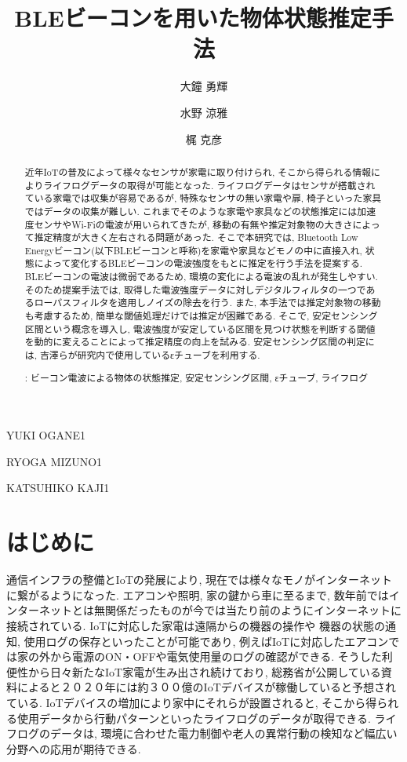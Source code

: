 \documentclass[Japanese]{dicomopapers}
\begin{document}
\title{BLEビーコンを用いた物体状態推定手法}


\author{大鐘 勇輝}{YUKI OGANE}{1}
\author{水野 涼雅}{RYOGA MIZUNO}{1}
\author{梶 克彦}{KATSUHIKO KAJI}{1}




\begin{abstract}
近年IoTの普及によって様々なセンサが家電に取り付けられ, そこから得られる情報によりライフログデータの取得が可能となった.
ライフログデータはセンサが搭載されている家電では収集が容易であるが, 特殊なセンサの無い家電や扉, 椅子といった家具ではデータの収集が難しい.
これまでそのような家電や家具などの状態推定には加速度センサやWi-Fiの電波が用いられてきたが, 移動の有無や推定対象物の大きさによって推定精度が大きく左右される問題があった.
そこで本研究では, Bluetooth Low Energyビーコン(以下BLEビーコンと呼称)を家電や家具などモノの中に直接入れ, 状態によって変化するBLEビーコンの電波強度をもとに推定を行う手法を提案する.
BLEビーコンの電波は微弱であるため, 環境の変化による電波の乱れが発生しやすい.
そのため提案手法では, 取得した電波強度データに対しデジタルフィルタの一つであるローパスフィルタを適用しノイズの除去を行う.
また, 本手法では推定対象物の移動も考慮するため, 簡単な閾値処理だけでは推定が困難である.
そこで, 安定センシング区間という概念を導入し, 電波強度が安定している区間を見つけ状態を判断する閾値を動的に変えることによって推定精度の向上を試みる.
安定センシング区間の判定には, 吉澤ら\cite{ips-chube}が研究内で使用しているεチューブを利用する.

 : ビーコン電波による物体の状態推定, 安定センシング区間, εチューブ, ライフログ


\end{abstract}

\maketitle

\section{はじめに}
通信インフラの整備とIoTの発展により, 現在では様々なモノがインターネットに繋がるようになった.
エアコンや照明, 家の鍵から車に至るまで, 数年前ではインターネットとは無関係だったものが今では当たり前のようにインターネットに接続されている.
IoTに対応した家電は遠隔からの機器の操作や 機器の状態の通知, 使用ログの保存といったことが可能であり, 例えばIoTに対応したエアコンでは家の外から電源のON・OFFや電気使用量のログの確認ができる.
そうした利便性から日々新たなIoT家電が生み出され続けており, 総務省が公開している資料\cite{soumusyo}によると２０２０年には約３００億のIoTデバイスが稼働していると予想されている.
IoTデバイスの増加により家中にそれらが設置されると, そこから得られる使用データから行動パターンといったライフログのデータが取得できる.
ライフログのデータは, 環境に合わせた電力制御や老人の異常行動の検知など幅広い分野への応用が期待できる.
\end{document}
